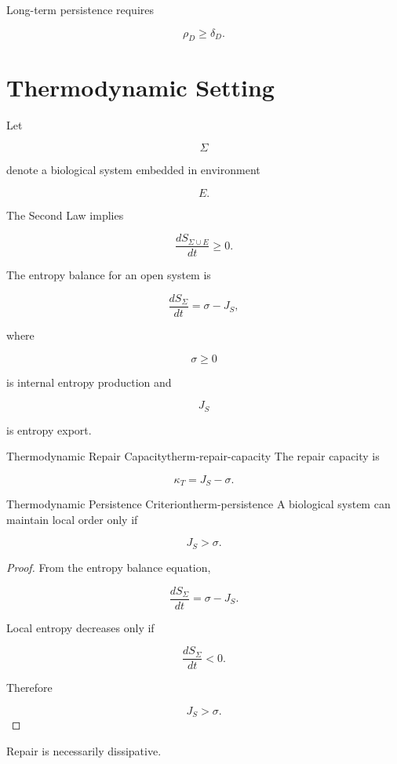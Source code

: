 \documentclass[12pt,twoside,openright]{book}
\begin{document}
\begin{corollary}
Long-term persistence requires

\[
\rho_D
\ge
\delta_D.
\]
\end{corollary}
\section{Thermodynamic Setting}

Let

\[
\Sigma
\]

denote a biological system embedded in environment

\[
E.
\]

The Second Law implies

\[
\frac{dS_{\Sigma\cup E}}{dt}
\ge0.
\]

The entropy balance for an open system is

\[
\frac{dS_\Sigma}{dt}
=
\sigma
-
J_S,
\]

where

\[
\sigma
\ge0
\]

is internal entropy production and

\[
J_S
\]

is entropy export.

\begin{definition}{Thermodynamic Repair Capacity}{therm-repair-capacity}
The repair capacity is

\[
\kappa_T
=
J_S-\sigma.
\]
\end{definition}

\begin{theorem}{Thermodynamic Persistence Criterion}{therm-persistence}
A biological system can maintain local order only if

\[
J_S
>
\sigma.
\]
\end{theorem}

\begin{proof}
From the entropy balance equation,

\[
\frac{dS_\Sigma}{dt}
=
\sigma-J_S.
\]

Local entropy decreases only if

\[
\frac{dS_\Sigma}{dt}<0.
\]

Therefore

\[
J_S>\sigma.
\]
\end{proof}

\begin{corollary}
Repair is necessarily dissipative.
\end{corollary}
\end{document}
